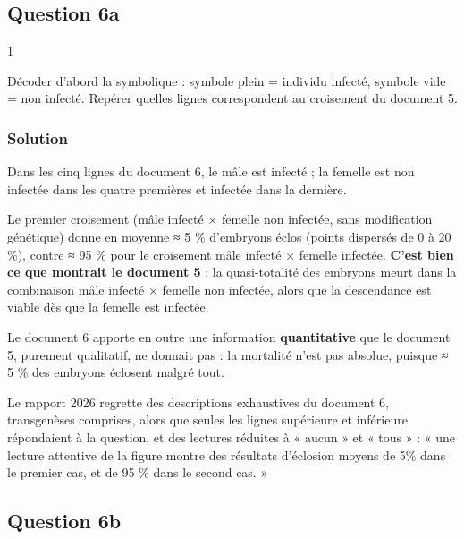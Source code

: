 \documentclass[11pt,a4paper]{article}
\begin{document}
\hypertarget{question-6a}{%
\subsection{Question 6a}\label{question-6a}}

\begin{indication}{1}

Décoder d'abord la symbolique : symbole plein = individu infecté, symbole vide = non infecté. Repérer quelles lignes correspondent au croisement du document 5.

\end{indication}

\hypertarget{solution-52}{%
\subsubsection{Solution}\label{solution-52}}

Dans les cinq lignes du document 6, le mâle est infecté ; la femelle est non infectée dans les quatre premières et infectée dans la dernière.

Le premier croisement (mâle infecté × femelle non infectée, sans modification génétique) donne en moyenne ≈ 5 \% d'embryons éclos (points dispersés de 0 à 20 \%), contre ≈ 95 \% pour le croisement mâle infecté × femelle infectée. \textbf{C'est bien ce que montrait le document 5} : la quasi-totalité des embryons meurt dans la combinaison mâle infecté × femelle non infectée, alors que la descendance est viable dès que la femelle est infectée.

Le document 6 apporte en outre une information \textbf{quantitative} que le document 5, purement qualitatif, ne donnait pas : la mortalité n'est pas absolue, puisque ≈ 5 \% des embryons éclosent malgré tout.

\begin{jury}

Le rapport 2026 regrette des descriptions exhaustives du document 6, transgenèses comprises, alors que seules les lignes supérieure et inférieure répondaient à la question, et des lectures réduites à « aucun » et « tous » : « une lecture attentive de la figure montre des résultats d'éclosion moyens de 5\% dans le premier cas, et de 95 \% dans le second cas. »

\end{jury}

\hypertarget{question-6b}{%
\subsection{Question 6b}\label{question-6b}}
\end{document}
